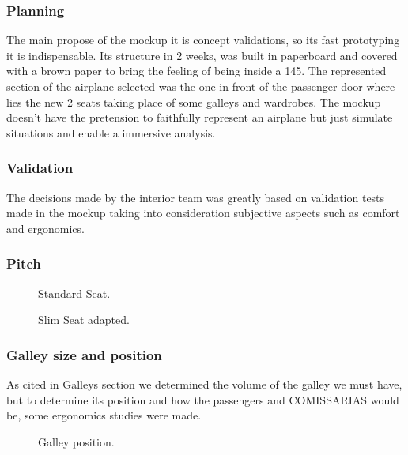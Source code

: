 ﻿\subsubsection{Planning}
The main propose of the mockup it is concept validations, so its fast prototyping it is indispensable. 
Its structure in 2 weeks, was built in paperboard and covered with a brown paper to bring the feeling of being inside a 145.
The represented section of the airplane selected was the one in front of the passenger door where lies the new 2 seats taking place of some galleys and wardrobes.
The mockup doesn't have the pretension to faithfully represent an airplane but just simulate situations and enable a immersive analysis.

\subsubsection{Validation}
The decisions made by the interior team was greatly based on validation tests made in the mockup taking into consideration subjective aspects such as comfort and ergonomics.

\subsubsection{Pitch}

\begin{figure}[H] %
\caption{Standard Seat.}
\label{fig:standardseat}
\end{figure}

\begin{figure}[H] %
\caption{Slim Seat adapted.}
\label{fig:adaptedseat}
\end{figure}




\subsubsection{Galley size and position}
As cited in Galleys section we determined the volume of the galley we must have, but to determine its position and how the passengers and COMISSARIAS would be, some ergonomics studies were made.


\begin{figure}[H] %
\caption{Galley position.}
\label{fig:galleypos_solo}
\end{figure}


